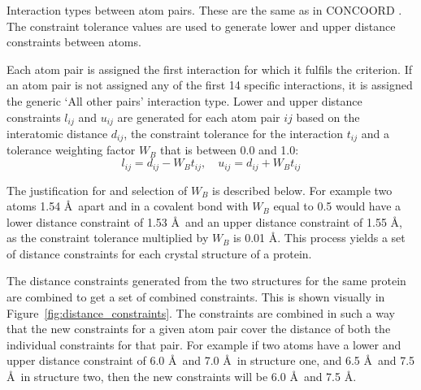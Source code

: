 \begin{table}
\caption[Interaction types between atom pairs in ExProSE]
{Interaction types between atom pairs.
These are the same as in CONCOORD \cite{DeGroot1997}.
The constraint tolerance values are used to generate lower and upper distance constraints between atoms.}

\label{tab:interaction_types}
\end{table}


Each atom pair is assigned the first interaction for which it fulfils the criterion.
If an atom pair is not assigned any of the first 14 specific interactions, it is assigned the generic `All other pairs' interaction type.
Lower and upper distance constraints $l_{ij}$ and $u_{ij}$ are generated for each atom pair $ij$ based on the interatomic distance $d_{ij}$, the constraint tolerance for the interaction $t_{ij}$ and a tolerance weighting factor $W_{B}$ that is between 0.0 and 1.0:
$$
l_{ij} = d_{ij} - W_{B} t_{ij}, \quad u_{ij} = d_{ij} + W_{B} t_{ij}
$$

The justification for and selection of $W_{B}$ is described below.
For example two atoms 1.54 \AA\ apart and in a covalent bond with $W_{B}$ equal to 0.5 would have a lower distance constraint of 1.53 \AA\ and an upper distance constraint of 1.55 \AA, as the constraint tolerance multiplied by $W_{B}$ is 0.01 \AA.
This process yields a set of distance constraints for each crystal structure of a protein.

The distance constraints generated from the two structures for the same protein are combined to get a set of combined constraints.
This is shown visually in Figure~\ref{fig:distance_constraints}.
The constraints are combined in such a way that the new constraints for a given atom pair cover the distance of both the individual constraints for that pair.
For example if two atoms have a lower and upper distance constraint of 6.0 \AA\ and 7.0 \AA\ in structure one, and 6.5 \AA\ and 7.5 \AA\ in structure two, then the new constraints will be 6.0 \AA\ and 7.5 \AA.


